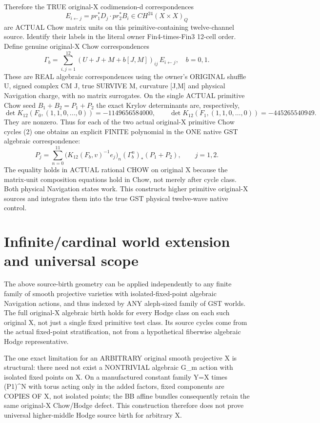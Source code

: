 \documentclass[11pt]{article}
\begin{document}
Therefore the TRUE original-X
codimension-d correspondences
\[
E_{i\leftarrow j}
=pr_1^*D_j\cdot pr_2^*B_i
\in CH^{24}(X\times X)_Q
\]
are ACTUAL Chow matrix units on this
primitive-containing twelve-channel source.
Identify their labels in the literal
owner Fin4-times-Fin3 12-cell order.
Define genuine original-X Chow correspondences
\[
\boxed{
\Gamma_b=\sum_{i,j=1}^{12}
 (U+J+M+b[J,M])_{ij}\,E_{i\leftarrow j}
,\quad b=0,1.
}\tag{5}
\]
These are REAL algebraic correspondences
using the owner's ORIGINAL shuffle U,
signed complex CM J, true SURVIVE M,
curvature [J,M] and physical Navigation
charge, with no matrix surrogates.
On the single ACTUAL primitive Chow seed
\(B_1+B_2=P_1+P_2\) the exact Krylov
determinants are, respectively,
\[
\det K_{12}(F_0,(1,1,0,\ldots,0))
=-1149656584000,\qquad
\det K_{12}(F_1,(1,1,0,\ldots,0))
=-445265540949.
\]
They are nonzero. Thus for each of the
two actual original-X primitive Chow
cycles (2) one obtains an explicit
FINITE polynomial in the ONE native
GST algebraic correspondence:
\[
\boxed{
P_j=\sum_{n=0}^{11}
\bigl(K_{12}(F_b,v)^{-1}e_j\bigr)_n
(\Gamma_b^n)_*(P_1+P_2),\qquad j=1,2.
}\tag{6}
\]
The equality holds in ACTUAL rational
CHOW on original X because the matrix-unit
composition equations hold in Chow,
not merely after cycle class.
Both physical Navigation states work.
This constructs higher primitive original-X
sources and integrates them into the true
GST physical twelve-wave native control.

\section{Infinite/cardinal world extension and universal scope}
The above source-birth geometry can be
applied independently to any finite
family of smooth projective varieties
with isolated-fixed-point algebraic
Navigation actions, and thus indexed
by ANY aleph-sized family of GST worlds.
The full original-X algebraic birth
holds for every Hodge class on each
such original X, not just a single
fixed primitive test class.
Its source cycles come from the
actual fixed-point stratification,
not from a hypothetical fiberwise
algebraic Hodge representative.

The one exact limitation for an
ARBITRARY original smooth projective
X is structural: there need not exist
a NONTRIVIAL algebraic G_m action with
isolated fixed points on X. On a
manufactured constant family
Y=X times (P1)^N with torus acting
only in the added factors, fixed
components are COPIES OF X, not
isolated points; the BB affine
bundles consequently retain the
same original-X Chow/Hodge defect.
This construction therefore does not
prove universal higher-middle Hodge
source birth for arbitrary X.
\end{document}
